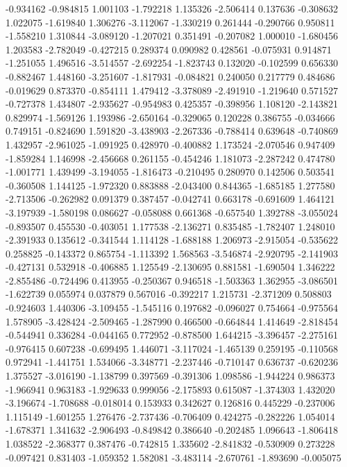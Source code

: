 -0.934162
-0.984815
1.001103
-1.792218
1.135326
-2.506414
0.137636
-0.308632
1.022075
-1.619840
1.306276
-3.112067
-1.330219
0.261444
-0.290766
0.950811
-1.558210
1.310844
-3.089120
-1.207021
0.351491
-0.207082
1.000010
-1.680456
1.203583
-2.782049
-0.427215
0.289374
0.090982
0.428561
-0.075931
0.914871
-1.251055
1.496516
-3.514557
-2.692254
-1.823743
0.132020
-0.102599
0.656330
-0.882467
1.448160
-3.251607
-1.817931
-0.084821
0.240050
0.217779
0.484686
-0.019629
0.873370
-0.854111
1.479412
-3.378089
-2.491910
-1.219640
0.571527
-0.727378
1.434807
-2.935627
-0.954983
0.425357
-0.398956
1.108120
-2.143821
0.829974
-1.569126
1.193986
-2.650164
-0.329065
0.120228
0.386755
-0.034666
0.749151
-0.824690
1.591820
-3.438903
-2.267336
-0.788414
0.639648
-0.740869
1.432957
-2.961025
-1.091925
0.428970
-0.400882
1.173524
-2.070546
0.947409
-1.859284
1.146998
-2.456668
0.261155
-0.454246
1.181073
-2.287242
0.474780
-1.001771
1.439499
-3.194055
-1.816473
-0.210495
0.280970
0.142506
0.503541
-0.360508
1.144125
-1.972320
0.883888
-2.043400
0.844365
-1.685185
1.277580
-2.713506
-0.262982
0.091379
0.387457
-0.042741
0.663178
-0.691609
1.464121
-3.197939
-1.580198
0.086627
-0.058088
0.661368
-0.657540
1.392788
-3.055024
-0.893507
0.455530
-0.403051
1.177538
-2.136271
0.835485
-1.782407
1.248010
-2.391933
0.135612
-0.341544
1.114128
-1.688188
1.206973
-2.915054
-0.535622
0.258825
-0.143372
0.865754
-1.113392
1.568563
-3.546874
-2.920795
-2.141903
-0.427131
0.532918
-0.406885
1.125549
-2.130695
0.881581
-1.690504
1.346222
-2.855486
-0.724496
0.413955
-0.250367
0.946518
-1.503363
1.362955
-3.086501
-1.622739
0.055974
0.037879
0.567016
-0.392217
1.215731
-2.371209
0.508803
-0.924603
1.440306
-3.109455
-1.545116
0.197682
-0.096027
0.754664
-0.975564
1.578905
-3.428424
-2.509465
-1.287990
0.466500
-0.664844
1.414649
-2.818454
-0.544941
0.336284
-0.044165
0.772952
-0.878500
1.644215
-3.396457
-2.275161
-0.976415
0.607238
-0.699495
1.446071
-3.117024
-1.465139
0.259195
-0.110568
0.972941
-1.441751
1.534066
-3.348771
-2.237446
-0.710147
0.636737
-0.620236
1.375527
-3.016190
-1.138799
0.397569
-0.391306
1.098586
-1.944224
0.986373
-1.966941
0.963183
-1.929633
0.999056
-2.175893
0.615087
-1.374303
1.432020
-3.196674
-1.708688
-0.018014
0.153933
0.342627
0.126816
0.445229
-0.237006
1.115149
-1.601255
1.276476
-2.737436
-0.706409
0.424275
-0.282226
1.054014
-1.678371
1.341632
-2.906493
-0.849842
0.386640
-0.202485
1.096643
-1.806418
1.038522
-2.368377
0.387476
-0.742815
1.335602
-2.841832
-0.530909
0.273228
-0.097421
0.831403
-1.059352
1.582081
-3.483114
-2.670761
-1.893690
-0.005075
